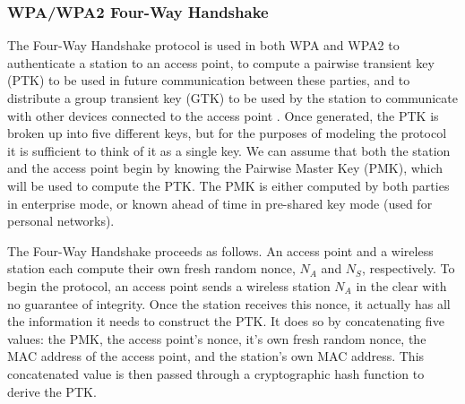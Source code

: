 \documentclass[11pt, twocolumn]{article} %
\begin{document}
{%

\subsubsection{WPA/WPA2 Four-Way Handshake}
The Four-Way Handshake protocol is used in both WPA and WPA2 to authenticate a station to an access point, to compute a pairwise transient key (PTK) to be used in future communication between these parties, and to distribute a group transient key (GTK) to be used by the station to communicate with other devices connected to the access point \cite{liu08}.  Once generated, the PTK is broken up into five different keys, but for the purposes of modeling the protocol it is sufficient to think of it as a single key.  We can assume that both the station and the access point begin by knowing the Pairwise Master Key (PMK), which will be used to compute the PTK.  The PMK is either computed by both parties in enterprise mode, or known ahead of time in pre-shared key mode (used for personal networks).

The Four-Way Handshake proceeds as follows.  An access point and a wireless station each compute their own fresh random nonce, $N_A$ and $N_S$, respectively.  To begin the protocol, an access point sends a wireless station $N_A$ in the clear with no guarantee of integrity.  Once the station receives this nonce, it actually has all the information it needs to construct the PTK.  It does so by concatenating five values: the PMK, the access point's nonce, it's own fresh random nonce, the MAC address of the access point, and the station's own MAC address.  This concatenated value is then passed through a cryptographic hash function to derive the PTK.  

}
\end{document}
